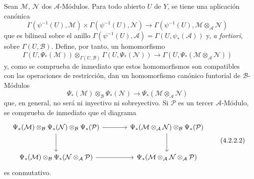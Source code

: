 \begin{env}[4.2.2]
\label{0.4.2.2-fr}
Sean $\mathcal{M}$, $\mathcal{N}$ dos $\mathcal{A}$-Módulos. Para todo
abierto $U$ de $Y$, se tiene una aplicación canónica
\[
  \Gamma(\psi^{-1}(U),\mathcal{M})
  \times\Gamma(\psi^{-1}(U),\mathcal{N})
  \longrightarrow
  \Gamma(\psi^{-1}(U),\mathcal{M}\otimes_{\mathcal{A}}\mathcal{N})
\]
que es bilineal sobre el anillo
$\Gamma(\psi^{-1}(U),\mathcal{A})=\Gamma(U,\psi_*(\mathcal{A}))$ y,
\emph{a fortiori}, sobre $\Gamma(U,\mathcal{B})$. Define, por tanto,
un homomorfismo
\[
  \Gamma(U,\Psi_*(\mathcal{M}))
  \otimes_{\Gamma(U,\mathcal{B})}
  \Gamma(U,\Psi_*(\mathcal{N}))
  \longrightarrow
  \Gamma(U,\Psi_*(\mathcal{M}\otimes_{\mathcal{A}}\mathcal{N}))
\]
y, como se comprueba de inmediato que estos homomorfismos son compatibles
con las operaciones de restricción, dan un homomorfismo canónico funtorial
de $\mathcal{B}$-Módulos
\[
  \Psi_*(\mathcal{M})\otimes_{\mathcal{B}}\Psi_*(\mathcal{N})
  \longrightarrow
  \Psi_*(\mathcal{M}\otimes_{\mathcal{A}}\mathcal{N})
  \tag{4.2.2.1}\label{0.4.2.2.1-fr}
\]
que, en general, no será ni inyectivo ni sobreyectivo. Si $\mathcal{P}$ es
un tercer $\mathcal{A}$-Módulo, se comprueba de inmediato que el diagrama
\[
\begin{tikzcd}[column sep=large,row sep=large]
\Psi_*(\mathcal{M})\otimes_{\mathcal{B}}\Psi_*(\mathcal{N})
  \otimes_{\mathcal{B}}\Psi_*(\mathcal{P})
  \arrow[r]
  \arrow[d]
&
\Psi_*(\mathcal{M}\otimes_{\mathcal{A}}\mathcal{N})
  \otimes_{\mathcal{B}}\Psi_*(\mathcal{P})
  \arrow[d]
\\
\Psi_*(\mathcal{M})\otimes_{\mathcal{B}}
  \Psi_*(\mathcal{N}\otimes_{\mathcal{A}}\mathcal{P})
  \arrow[r]
&
\Psi_*(\mathcal{M}\otimes_{\mathcal{A}}\mathcal{N}
  \otimes_{\mathcal{A}}\mathcal{P})
\end{tikzcd}
\tag{4.2.2.2}\label{0.4.2.2.2-fr}
\]
es conmutativo.
\end{env}
